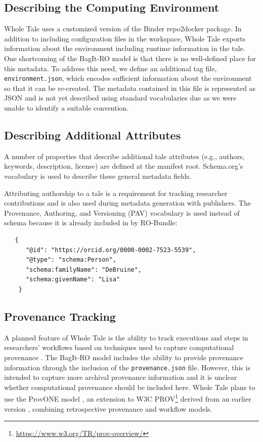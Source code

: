 \documentclass[conference]{IEEEtran}
\begin{document}
\subsection{Describing the Computing Environment}
Whole Tale uses a customized version of the Binder repo2docker package. In addition to including configuration files in the workspace, Whole Tale exports information about the environment including runtime information in the tale. One shortcoming of the BagIt-RO model is that there is no well-defined place for this metadata. To address this need, we define an additional tag file, \texttt{environment.json}, which encodes sufficient information about the environment  so that it can be re-created. The metadata contained in this file is represented as JSON and is not yet described using standard vocabularies due as we were unable to identify a suitable convention.

\subsection{Describing Additional Attributes}
A number of properties that describe additional tale attributes (e.g., authors, keywords, description, license) are defined at the manifest root. Schema.org's vocabulary is used to describe these general metadata fields.

Attributing authorship to a tale is a requirement for tracking researcher contributions and is also used during metadata generation with publishers. The Provenance, Authoring, and Versioning (PAV) vocabulary is used instead of schema because it is already included in by RO-Bundle: 

\begin{lstlisting}
   {
      "@id": "https://orcid.org/0000-0002-7523-5539",
      "@type": "schema:Person",
      "schema:familyName": "DeBruine",
      "schema:givenName": "Lisa"
    }
\end{lstlisting}
		
		
\subsection{Provenance Tracking}

A planned feature of Whole Tale is the ability to track executions and
steps in researchers' workflows based on techniques used to capture
computational provenance
\cite{mcphillips2015retrospective,Chirigati2016,That2017,Yuan2018}. 
The BagIt-RO model includes the ability to provide provenance
information through the inclusion of the \texttt{provenance.json}
file. However, this is intended to capture more archival provenance
information and it is unclear whether computational provenance should
be included here. 
Whole Tale plans to use the ProvONE model \cite {ProvONE}, an
extension to W3C
PROV\footnote{\url{https://www.w3.org/TR/prov-overview/}} derived from
an earlier version \cite{missier2013dprov}, combining retrospective
provenance and workflow models.
\end{document}
